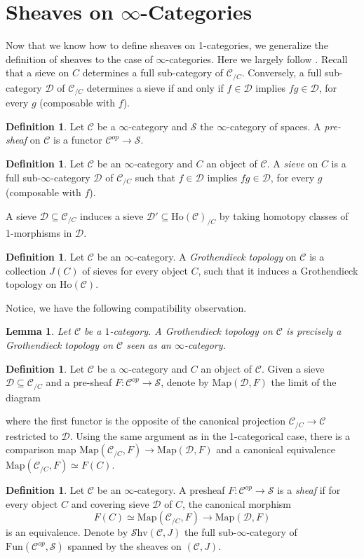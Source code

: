 \documentclass[10pt]{amsart}
\newcommand{\C}{\mathscr{C}}
\newcommand{\D}{\mathscr{D}}
\newcommand{\s}{\mathscr{S}}
\newcommand{\Map}{\mathrm{Map}}
\newcommand{\Ho}{\mathrm{Ho}}
\newcommand{\Fun}{\mathrm{Fun}}
\newcommand{\Shv}{\mathscr{S}\mathrm{hv}}
\newtheorem{lemma}[equation]{Lemma}
\theoremstyle{definition}
\newtheorem{definition}[equation]{Definition}
\theoremstyle{remark}
\numberwithin{equation}{section}
\begin{document}
	\section{Sheaves on \texorpdfstring{$\infty$}{oo}-Categories}
	Now that we know how  to define sheaves on 1-categories, we generalize the definition of sheaves to the case of $\infty$-categories. Here we largely follow \cite{lurie2009htt}. Recall that a sieve on $C$ determines a full sub-category of $\C_{/C}$. Conversely, a full sub-category $\D$ of $\C_{/C}$ determines a sieve if and only if $f\in\D$ implies $fg\in\D$, for every $g$ (composable with $f$). 
	\begin{definition}
		Let $\C$ be a $\infty$-category and $\s$ the $\infty$-category of spaces. A \textit{pre-sheaf} on $\C$ is a functor $\C^{op}\to\s$.
	\end{definition}
	\begin{definition}
		Let $\C$ be an $\infty$-category and $C$ an object of $\C$. A \textit{sieve} on $C$ is a full sub-$\infty$-category $\D$ of $\C_{/C}$ such that $f\in\D$ implies $fg\in\D$, for every $g$ (composable with $f$).  
	\end{definition}
	A sieve $\D\subseteq\C_{/C}$ induces a sieve $\D'\subseteq\Ho(\C)_{/C}$ by taking homotopy classes of 1-morphisms in $\D$. 
	\begin{definition}
		Let $\C$ be an $\infty$-category. A \emph{Grothendieck topology} on $\C$ is a collection $J(C)$ of sieves for every object $C$, such that it induces a Grothendieck topology on $\Ho(\C)$. 
	\end{definition}
	
	Notice, we have the following compatibility observation.
	\begin{lemma}
		Let $\C$ be a $1$-category. A Grothendieck topology on $\C$ is precisely a Grothendieck topology on $\C$ seen as an $\infty$-category.
	\end{lemma}
	\begin{definition}
		Let $\C$ be a $\infty$-category and $C$ an object of $\C$. Given a sieve $\D\subseteq\C_{/C}$ and a pre-sheaf $F:\C^{op}\to\s$, denote by $\Map(\D,F)$ the limit of the diagram \begin{center}
	\end{center}where the first functor is the opposite of the canonical projection $\C_{/C}\to\C$ restricted to $\D$. Using the same argument as in the 1-categorical case, there is a comparison map $\Map(\C_{/C},F)\to\Map(\D,F)$ and a canonical equivalence $\Map(\C_{/C},F)\simeq F(C)$. 
	\end{definition}
	\begin{definition}
		Let $\C$ be an $\infty$-category. A presheaf $F\colon\C^{op}\to\s$ is a \emph{sheaf} if for every object $C$ and covering sieve $\D$ of $C$, the canonical morphism
		\[ F(C)\simeq\Map(\C_{/C},F) \to \Map(\D,F) \]
		is an equivalence. Denote by $\Shv(\C,J)$ the full sub-$\infty$-category of $\Fun(\C^{op},\s)$ spanned by the sheaves on $(\C,J)$.
	\end{definition}
	
\end{document}

